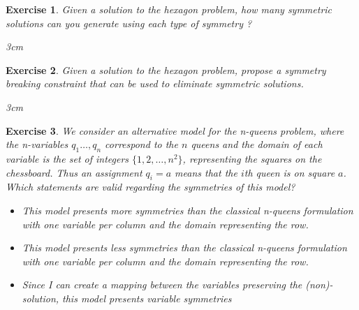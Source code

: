 \documentclass{article}
\newtheorem{exercise}{Exercise}[section]
\begin{document}
    \begin{exercise}
        Given a solution to the hexagon problem, how many symmetric solutions can you generate
        using each type of symmetry ?
        \begin{answerbox}[title=Answer]{3cm}
        \end{answerbox}
        \label{ex:symmetry3}
    \end{exercise}

    \begin{exercise}
        Given a solution to the hexagon problem,
        propose a symmetry breaking constraint that can be used to eliminate symmetric solutions.
        \begin{answerbox}[title=Answer]{3cm}
        \end{answerbox}
        \label{ex:symmetry4}
    \end{exercise}


    \begin{exercise}
        We consider an alternative model for the n-queens problem, where the n-variables $q_1 \ldots,q_n$
        correspond to the $n$ queens and the domain of each variable
        is the set of integers $\{1,2,\ldots,n^2\}$, representing the squares on the chessboard.
        Thus an assignment $q_i=a$ means that the $i$th queen is on square $a$.
        Which statements are valid regarding the symmetries of this model?
        \begin{itemize}
            \item This model presents more symmetries than the classical n-queens formulation with one variable per column and the domain representing the row.
            \item This model presents less symmetries than the classical n-queens formulation with one variable per column and the domain representing the row.
            \item Since I can create a mapping between the variables preserving the (non)-solution, this model presents variable symmetries
        \end{itemize}
        \label{ex:queens_symmetry1}
    \end{exercise}
\end{document}
